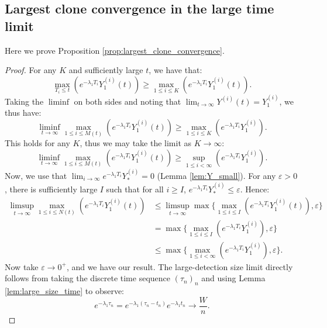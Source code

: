 \documentclass{article}
\numberwithin{equation}{section}
\begin{document}
\subsection{Largest clone convergence in the large time limit}\label{app:largest_clone_convergence}
Here we prove Proposition \ref{prop:largest_clone_convergence}.
\LargestClone*
\begin{proof}
For any $K$ and sufficiently large $t$, we have that:
\[
\max_{T_i\leq t}\left( e^{-\lambda_1 T_i}Y_1^{(i)}(t)\right)\geq \max_{1\leq i\leq K}\left( e^{-\lambda_1 T_i}Y_1^{(i)}(t)\right).
\]
Taking the $\liminf$ on both sides and noting that $\lim_{t\to\infty}Y^{(i)}(t)=Y_1^{(i)}$, we thus have:
\[
\liminf_{t\to\infty}\max_{1\leq i\leq M(t)}\left( e^{-\lambda_1 T_i}Y_1^{(i)}(t)\right)\geq \max_{1\leq i\leq K}\left( e^{-\lambda_1 T_i}Y_1^{(i)}\right).
\]
This holds for any $K$, thus we may take the limit as $K\to\infty$:
\[
\liminf_{t\to\infty}\max_{1\leq i\leq M(t)}\left( e^{-\lambda_1 T_i}Y_1^{(i)}(t)\right)\geq \sup_{1\leq i<\infty}\left( e^{-\lambda_1 T_i}Y_1^{(i)}\right).
\]
Now, we use that $\lim_{i\to\infty}e^{-\lambda_1 T_i}Y_*^{(i)}=0$ (Lemma \ref{lem:Y_small}). For any $\varepsilon>0$, there is sufficiently large $I$ such that for all $i\geq I$, $e^{-\lambda_1 T_i}Y_*^{(i)}\leq \varepsilon$. Hence:
\begin{align*}
        \limsup_{t\to\infty}\max_{1\leq i\leq N(t)}\left( e^{-\lambda_1 T_i}Y_1^{(i)}(t)\right)&\leq \limsup_{t\to\infty}\max\{\max_{1\leq i\leq I}\left(e^{-\lambda_1 T_i}Y_1^{(i)}(t)\right),\varepsilon\}\\
        &=\max\{\max_{1\leq i\leq I}\left(e^{-\lambda_1 T_i}Y_1^{(i)}\right),\varepsilon\}\\
        &\leq \max\{\max_{1\leq i<\infty}\left(e^{-\lambda_1 T_i}Y_1^{(i)}\right),\varepsilon\}.
\end{align*}
Now take $\varepsilon\to0^+$, and we have our result. The large-detection size limit directly follows from taking the discrete time sequence $(\tau_n)_n$ and using Lemma \ref{lem:large_size_time} to observe:
    \[
    e^{-\lambda_1 \tau_n}=e^{-\lambda_1(\tau_n-t_n)}e^{-\lambda_1 t_n}\to \frac{W}{n}.
    \]
\end{proof}
\end{document}
